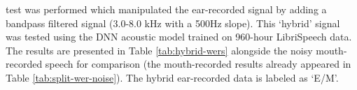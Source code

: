 {%
}%

\DIFdelend \DIFaddbegin {}\DIFaddend test was performed which manipulated the ear-recorded signal by adding \DIFaddbegin {}\DIFaddend a bandpass filtered \DIFdelbegin {}\DIFdelend \DIFaddbegin {}\DIFaddend signal (3.0-8.0 kHz with a 500Hz slope)\DIFdelbegin {}\DIFdelend .  This `hybrid' signal was tested using the \DIFdelbegin {}\DIFdelend \DIFaddbegin {}\DIFaddend DNN acoustic model trained on 960-hour LibriSpeech data.  The results are presented in Table \ref{tab:hybrid-wers} alongside the noisy mouth-recorded speech for comparison (the mouth-recorded results already appeared in Table \ref{tab:split-wer-noise}).  The hybrid ear-recorded data is labeled as `E/M'.

